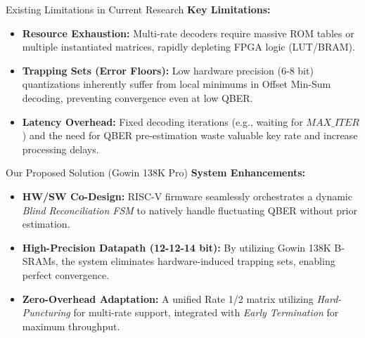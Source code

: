 \documentclass[t, aspectratio=169]{beamer}
\begin{document}
	\begin{frame}{Existing Limitations in Current Research}
        \textbf{Key Limitations:}
        \begin{itemize}
            \item \textbf{Resource Exhaustion:} Multi-rate decoders require massive ROM tables or multiple instantiated matrices, rapidly depleting FPGA logic (LUT/BRAM).
            \vspace{0.8em}
            \item \textbf{Trapping Sets (Error Floors):} Low hardware precision (6-8 bit) quantizations inherently suffer from local minimums in Offset Min-Sum decoding, preventing convergence even at low QBER.
            \vspace{0.8em}
            \item \textbf{Latency Overhead:} Fixed decoding iterations (e.g., waiting for $MAX\_ITER$) and the need for QBER pre-estimation waste valuable key rate and increase processing delays.
        \end{itemize}
	\end{frame}

	\begin{frame}{Our Proposed Solution (Gowin 138K Pro)}
        \textbf{System Enhancements:}
        \begin{itemize}
            \item \textbf{HW/SW Co-Design:} RISC-V firmware seamlessly orchestrates a dynamic \textit{Blind Reconciliation FSM} to natively handle fluctuating QBER without prior estimation.
            \vspace{0.8em}
            \item \textbf{High-Precision Datapath (12-12-14 bit):} By utilizing Gowin 138K B-SRAMs, the system eliminates hardware-induced trapping sets, enabling perfect convergence.
            \vspace{0.8em}
            \item \textbf{Zero-Overhead Adaptation:} A unified Rate 1/2 matrix utilizing \textit{Hard-Puncturing} for multi-rate support, integrated with \textit{Early Termination} for maximum throughput.
        \end{itemize}
	\end{frame}
	
\end{document}
